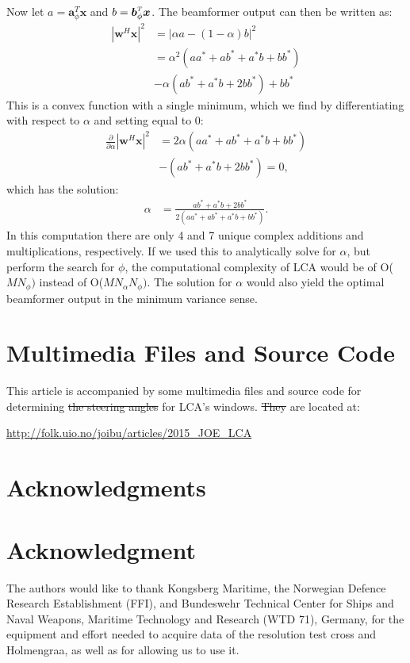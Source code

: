 \documentclass[10pt,journal,draftclsnofoot,onecolumn]{IEEEtran}
\newcommand\nn{\nonumber\\}
\newcommand\T{^{\scriptscriptstyle T}}
\renewcommand\H{^{\scriptscriptstyle H}}
\renewcommand\vec[1]{\boldsymbol{#1}}
\newcommand\1{\vec 1}
\renewcommand*\a{\vec a}
\newcommand*\w{\vec w}
\newcommand*\x{\vec x}
\newcommand\articlePath{http://folk.uio.no/joibu/articles/2015_JOE_LCA}
\providecommand{\DIFadd}[1]{{\protect\color{blue}\uwave{#1}}} %
\providecommand{\DIFdel}[1]{{\protect\color{red}\sout{#1}}}                      %
\providecommand{\DIFaddbegin}{} %
\providecommand{\DIFaddend}{} %
\providecommand{\DIFdelbegin}{} %
\providecommand{\DIFdelend}{} %
\begin{document}
Now let $a=\a_\phi\T\x$ and $b=\b_\phi\T\x$. The beamformer output can then be written as:
%
\begin{align}
|\w\H\x|^2 &= \Big| \alpha a - (1-\alpha)b \Big|^2 \nn
&= \alpha^2 (aa^* + ab^* + a^*b + bb^*) \nn
&- \alpha(ab^* + a^*b + 2bb^*) + bb^*
\end{align}
%
This is a convex function with a single minimum, which we find by differentiating with respect to $\alpha$ and setting equal to 0:
%
\begin{align}
\frac{\partial}{\partial\alpha} |\w\H\x|^2 
&= 2\alpha (aa^* + ab^* + a^*b + bb^*) \nn
&- (ab^* + a^*b + 2bb^*) = 0,
\end{align}
%
which has the solution:
%
\begin{align}
\alpha &= \frac{ab^* + a^*b + 2bb^*}{2(aa^* + ab^* + a^*b + bb^*)}.
\end{align}
%
In this computation there are only 4 and 7 unique complex additions and multiplications, respectively. If we used this to analytically solve for $\alpha$, but perform the search for $\phi$, the computational complexity of LCA would be of O($MN_\phi)$ instead of O($MN_\alpha N_\phi)$. The solution for $\alpha$ would also yield the optimal beamformer output in the minimum variance sense.


\section{Multimedia Files and Source Code}\label{app:source_code}

This article is accompanied by some multimedia files and source code for determining \DIFdelbegin \DIFdel{the steering angles }\DIFdelend \DIFaddbegin \DIFadd{steering boundaries }\DIFaddend for LCA's windows. \DIFdelbegin \DIFdel{They }\DIFdelend \DIFaddbegin \DIFadd{The files }\DIFaddend are located at:

\url{\articlePath}



\ifCLASSOPTIONcompsoc
  \section*{Acknowledgments}
\else
  \section*{Acknowledgment}
\fi

The authors would like to thank Kongsberg Maritime, the Norwegian Defence Research Establishment (FFI), and Bundeswehr Technical Center for Ships and Naval Weapons, Maritime Technology and Research (WTD 71), Germany, for the equipment and effort needed to acquire data of the resolution test cross and Holmengraa, as well as for allowing us to use it.
\end{document}
